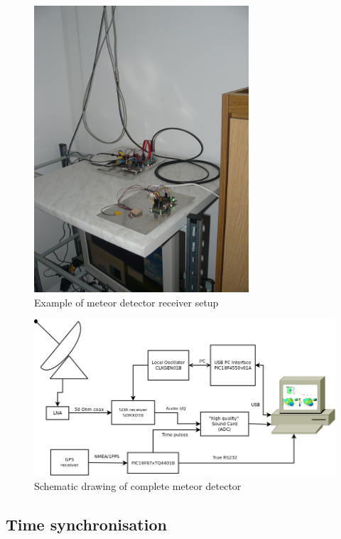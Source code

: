 \documentclass[12pt,a4paper,oneside]{article}
\begin{document}
\begin{figure} [htbp]
\begin{center}
\includegraphics [width=80mm] {./img/meteor-detector_receiver.JPG} 
\end{center}
\caption{Example of meteor detector receiver setup}
\end{figure}


\begin{figure} [htbp]
\begin{center}
\includegraphics [width=150mm] {./img/block_schematic.png} 
\end{center}
\caption{Schematic drawing of complete meteor detector}
\end{figure}


\subsection{Time synchronisation}
\end{document}
